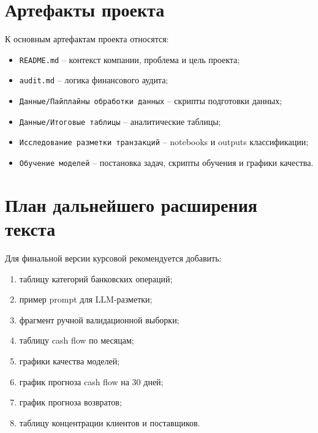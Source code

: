 \chapter{Артефакты проекта}

К основным артефактам проекта относятся:
\begin{itemize}
  \item \texttt{README.md} -- контекст компании, проблема и цель проекта;
  \item \texttt{audit.md} -- логика финансового аудита;
  \item \texttt{Данные/Пайплайны обработки данных} -- скрипты подготовки данных;
  \item \texttt{Данные/Итоговые таблицы} -- аналитические таблицы;
  \item \texttt{Исследование разметки транзакций} -- notebooks и outputs классификации;
  \item \texttt{Обучение моделей} -- постановка задач, скрипты обучения и графики качества.
\end{itemize}

\chapter{План дальнейшего расширения текста}

Для финальной версии курсовой рекомендуется добавить:
\begin{enumerate}
  \item таблицу категорий банковских операций;
  \item пример prompt для LLM-разметки;
  \item фрагмент ручной валидационной выборки;
  \item таблицу cash flow по месяцам;
  \item графики качества моделей;
  \item график прогноза cash flow на 30 дней;
  \item график прогноза возвратов;
  \item таблицу концентрации клиентов и поставщиков.
\end{enumerate}
